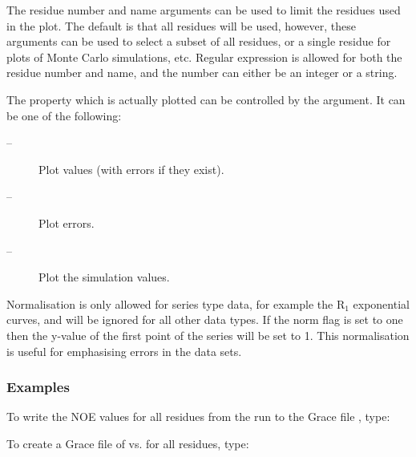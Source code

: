  The residue number and name arguments can be used to limit the residues used in the plot. The default is that all residues will be used, however, these arguments can be used to select a subset of all residues, or a single residue for plots of Monte Carlo simulations, etc.  Regular expression is allowed for both the residue number and name, and the number can either be an integer or a string. 
  

 The property which is actually plotted can be controlled by the  argument.  It can be one of the following: 
  

 \begin{description} 
 \item[ --]  Plot values (with errors if they exist).  
 \item[ --]  Plot errors.  
 \item[ --]   Plot the simulation values.  
 \end{description} 
  

 Normalisation is only allowed for series type data, for example the R$_1$ exponential curves, and will be ignored for all other data types.  If the norm flag is set to one then the y-value of the first point of the series will be set to 1.  This normalisation is useful for emphasising errors in the data sets. 
  

  
 \subsubsection{Examples} 

 To write the NOE values for all residues from the run  to the Grace file , type: 
  





 To create a Grace file of  vs.  for all residues, type: 
  

